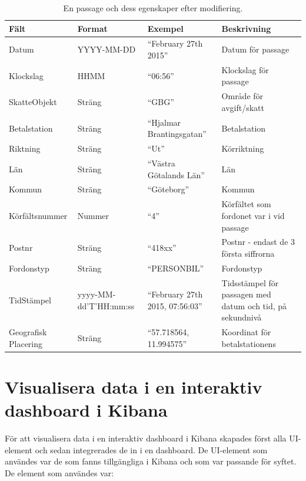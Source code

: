 \documentclass[12pt]{kththesis}
\begin{document}
\captionsetup[table]{name=Tabell}

\begin{table}[h!]
  \begin{center}
    \caption{En passage och dess egenskaper efter modifiering.}
    \label{tab:table1}
    \begin{tabular}{|p{3cm}|p{3cm}|p{3cm}|p{3cm}|}
         \hline
      \textbf{Fält} & \textbf{Format} & \textbf{Exempel} & \textbf{Beskrivning}\\
      \hline
      Datum & YYYY-MM-DD & “February 27th 2015” & Datum för passage\\ %
        \hline
      Klockslag & HHMM& “06:56” & Klockslag för passage\\ %
        \hline
      SkatteObjekt & Sträng & “GBG”
 & Område för avgift/skatt\\ %
        \hline
      Betalstation & Sträng & “Hjalmar Brantingsgatan” & Betalstation\\ %
        \hline
      Riktning & Sträng & “Ut” & Körriktning\\ %
        \hline
      Län & Sträng & “Västra Götalands Län” & Län\\ %
        \hline
      Kommun & Sträng & “Göteborg” & Kommun\\ %
        \hline
      Körfältsnummer & Nummer & “4” &  Körfältet som fordonet var i vid passage\\ %
        \hline
          Postnr & Sträng & “418xx”
 & Postnr - endast de 3 första siffrorna\\ %
        \hline
          Fordonstyp & Sträng & “PERSONBIL” & Fordonstyp\\ %
        \hline
          TidStämpel & yyyy-MM-dd'T'HH:mm:ss
 & “February 27th 2015, 07:56:03” & Tidsstämpel för passagen med datum och tid, på sekundnivå 
\\ %
        \hline
Geografisk Placering & Sträng & “57.718564, 11.994575” & 
Koordinat för betalstationens 
\\ %
        \hline
    \end{tabular}
  \end{center}
\end{table}


\section{Visualisera data i en interaktiv dashboard i Kibana}

För att visualisera data i en interaktiv dashboard i Kibana skapades först alla UI-element och sedan integrerades de in i en dashboard. De UI-element som användes var de som fanns tillgängliga i Kibana och som var passande för syftet. De element som användes var:
\end{document}
